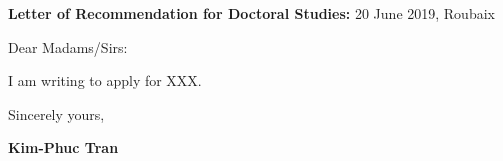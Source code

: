 \documentclass[a4paper,11pt]{article}
\begin{document}
{\hspace*{-\marginparsep minus \marginparwidth}
\begin{minipage}[t]{\textwidth+\marginparwidth+\marginparsep}

\vspace{0.25cm}

\textbf{Letter of Recommendation for Doctoral Studies:} \hfill{20 June 2019, Roubaix}

\vspace{0.75cm}

Dear Madams/Sirs:

\vspace{0.3cm}

I am writing to apply for XXX. 

\vspace{0.3cm}



\vspace{0.3cm}

Sincerely yours,

\vspace{0.3cm}

\textbf{Kim-Phuc Tran}

\end{minipage}}
\end{document}
